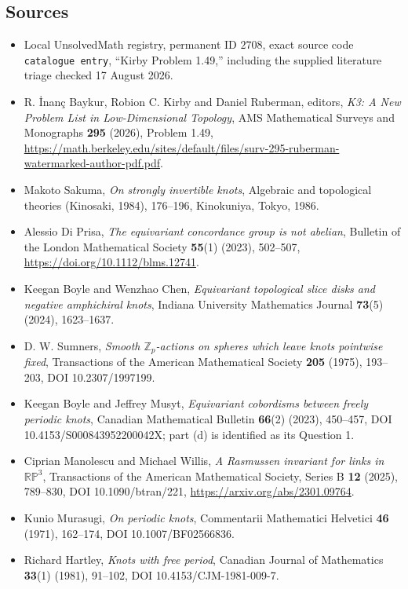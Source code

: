 \documentclass[11pt]{article}
\newcommand{\Z}{\mathbb{Z}}
\begin{document}
\subsection{Sources}
\begin{itemize}
\item Local UnsolvedMath registry, permanent ID $2708$, exact source code \texttt{catalogue entry}, ``Kirby Problem 1.49,'' including the supplied literature triage checked 17 August 2026.
\item R. \.{I}nan\c c Baykur, Robion C. Kirby and Daniel Ruberman, editors, \emph{K3: A New Problem List in Low-Dimensional Topology}, AMS Mathematical Surveys and Monographs \textbf{295} (2026), Problem 1.49, \url{https://math.berkeley.edu/sites/default/files/surv-295-ruberman-watermarked-author-pdf.pdf}.
\item [Sak86] Makoto Sakuma, \emph{On strongly invertible knots}, Algebraic and topological theories (Kinosaki, 1984), 176--196, Kinokuniya, Tokyo, 1986.
\item [DP23b] Alessio Di Prisa, \emph{The equivariant concordance group is not abelian}, Bulletin of the London Mathematical Society \textbf{55}(1) (2023), 502--507, \url{https://doi.org/10.1112/blms.12741}.
\item [BC24b] Keegan Boyle and Wenzhao Chen, \emph{Equivariant topological slice disks and negative amphichiral knots}, Indiana University Mathematics Journal \textbf{73}(5) (2024), 1623--1637.
\item [Sum75] D. W. Sumners, \emph{Smooth $\Z_p$-actions on spheres which leave knots pointwise fixed}, Transactions of the American Mathematical Society \textbf{205} (1975), 193--203, DOI 10.2307/1997199.
\item [BM23] Keegan Boyle and Jeffrey Musyt, \emph{Equivariant cobordisms between freely periodic knots}, Canadian Mathematical Bulletin \textbf{66}(2) (2023), 450--457, DOI 10.4153/S000843952200042X; part (d) is identified as its Question 1.
\item [MW25] Ciprian Manolescu and Michael Willis, \emph{A Rasmussen invariant for links in $\mathbb{RP}^3$}, Transactions of the American Mathematical Society, Series B \textbf{12} (2025), 789--830, DOI 10.1090/btran/221, \url{https://arxiv.org/abs/2301.09764}.
\item [Mur71] Kunio Murasugi, \emph{On periodic knots}, Commentarii Mathematici Helvetici \textbf{46} (1971), 162--174, DOI 10.1007/BF02566836.
\item [Har81] Richard Hartley, \emph{Knots with free period}, Canadian Journal of Mathematics \textbf{33}(1) (1981), 91--102, DOI 10.4153/CJM-1981-009-7.

\end{itemize}
\end{document}

